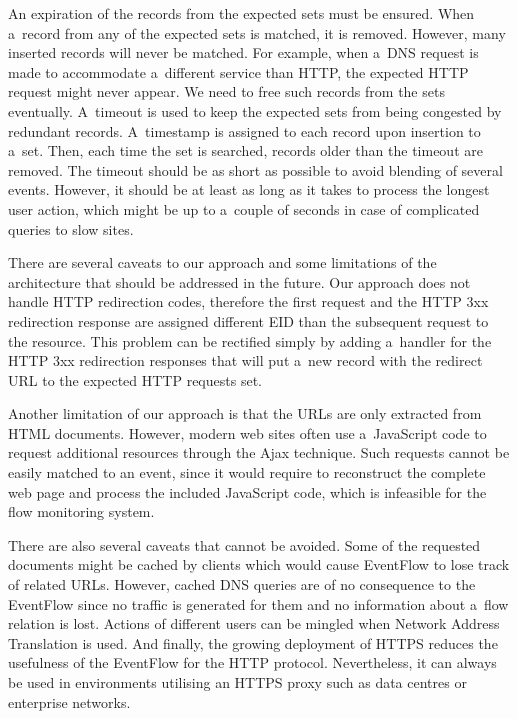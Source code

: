 An expiration of the records from the expected sets must be ensured. When a~record from any of the expected sets is matched, it is removed. However, many inserted records will never be matched. For example, when a~DNS request is made to accommodate a~different service than HTTP, the expected HTTP request might never appear. We need to free such records from the sets eventually. A~timeout is used to keep the expected sets from being congested by redundant records. A~timestamp is assigned to each record upon insertion to a~set. Then, each time the set is searched, records older than the timeout are removed. The timeout should be as short as possible to avoid blending of several events. However, it should be at least as long as it takes to process the longest user action, which might be up to a~couple of seconds in case of complicated queries to slow sites.

There are several caveats to our approach and some limitations of the architecture that should be addressed in the future. Our approach does not handle HTTP redirection codes, therefore the first request and the HTTP 3xx redirection response are assigned different EID than the subsequent request to the resource. This problem can be rectified simply by adding a~handler for the HTTP 3xx redirection responses that will put a~new record with the redirect URL to the expected HTTP requests set.

Another limitation of our approach is that the URLs are only extracted from HTML documents. However, modern web sites often use a~JavaScript code to request additional resources through the Ajax technique. Such requests cannot be easily matched to an event, since it would require to reconstruct the complete web page and process the included JavaScript code, which is infeasible for the flow monitoring system.

There are also several caveats that cannot be avoided. Some of the requested documents might be cached by clients which would cause EventFlow to lose track of related URLs. However, cached DNS queries are of no consequence to the EventFlow since no traffic is generated for them and no information about a~flow relation is lost. Actions of different users can be mingled when Network Address Translation is used. And finally, the growing deployment of HTTPS reduces the usefulness of the EventFlow for the HTTP protocol. Nevertheless, it can always be used in environments utilising an HTTPS proxy such as data centres or enterprise networks.



